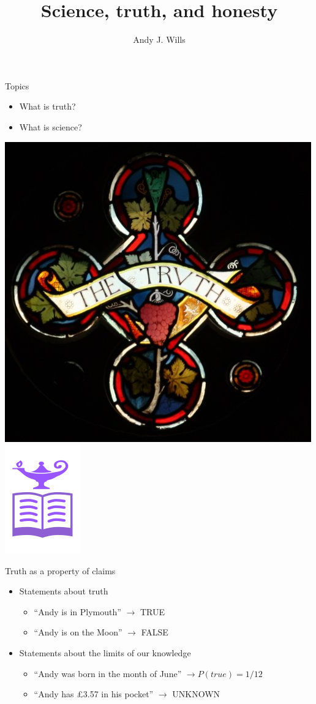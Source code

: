\documentclass{beamer}
\title[Critical Thinking]{Science, truth, and honesty }
\author{Andy J. Wills}
\date{}
\begin{document}
\frame{\titlepage}


\begin{frame}{Topics}
	\begin{itemize}
		\item What is truth? 
		\item What is science?  
	\end{itemize}
	\centerline{
	\includegraphics[width=.3\textwidth]{pics/truth.jpg}
	\includegraphics[width=.3\textwidth]{pics/science.png}
      }

\end{frame}

\begin{frame}{Truth as a property of claims}
	\begin{itemize}
		\item Statements about truth
		\begin{itemize}
			\item ``Andy is in Plymouth'' $\to$ TRUE 
			\item ``Andy is on the Moon'' $\to$ FALSE 
		\end{itemize}
		\item Statements about the limits of our knowledge
		\begin{itemize}
			\item ``Andy was born in the month of June'' $\to P(true) = 1/12$ 
			\item ``Andy has \pounds 3.57 in his pocket'' $\to$ UNKNOWN
		\end{itemize}  
	\end{itemize}
\end{frame}
\end{document}
